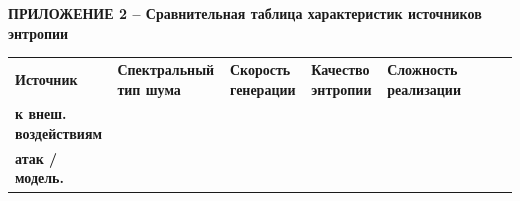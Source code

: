 
\clearpage
\begin{landscape}
\begin{center}\normalsize\bfseries
ПРИЛОЖЕНИЕ 2 -- Сравнительная таблица характеристик источников
энтропии
\end{center}
\nopagebreak\vspace{0.25\baselineskip}\nopagebreak
\centering
{\scriptsize\setlength{\tabcolsep}{2.6pt}\renewcommand{\arraystretch}{0.92}%
{\def\LTcaptype{none} %
\begin{longtable}[]{@{}|%
  >{\raggedright\arraybackslash}p{}|%
  >{\raggedright\arraybackslash}p{}|%
  >{\raggedright\arraybackslash}p{}|%
  >{\raggedright\arraybackslash}p{}|%
  >{\raggedright\arraybackslash}p{}|%
  >{\raggedright\arraybackslash}p{}|%
  >{\raggedright\arraybackslash}p{}|%
  >{\raggedright\arraybackslash}p{}|@{}}
\hline
\begin{minipage}[b]{\hsize}\raggedright
\textbf{Источник}
\end{minipage} & \begin{minipage}[b]{\hsize}\raggedright
\textbf{Спектральный тип шума}
\end{minipage} & \begin{minipage}[b]{\hsize}\raggedright
\textbf{Скорость генерации}
\end{minipage} & \begin{minipage}[b]{\hsize}\raggedright
\textbf{Качество энтропии}
\end{minipage} & \begin{minipage}[b]{\hsize}\raggedright
\textbf{Сложность реализации}
\end{minipage} & \begin{minipage}[b]{\hsize}\raggedright\textbf{Устойчивость}\\\textbf{к внеш.\,воздействиям}%
\end{minipage} & \begin{minipage}[b]{\hsize}\raggedright\textbf{Защита от}\\\textbf{атак / модель.}%

\end{minipage}
\end{longtable}}}
\end{landscape}
